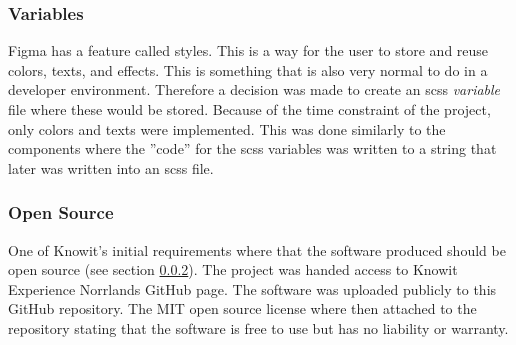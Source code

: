 



\subsubsection{Variables}%
\label{ssub:Variables}
Figma has a feature called styles. This is a way for the user to store and reuse colors, texts, and effects. This is something that is also very normal to do in a developer environment. Therefore a decision was made to create an \acrshort{scss} \textit{variable} file where these would be stored. Because of the time constraint of the project, only colors and texts were implemented. This was done similarly to the components where the ''code'' for the \acrshort{scss} variables was written to a string that later was written into an \acrshort{scss} file. 


\subsubsection{Open Source}%
\label{ssub:Open Source}
One of Knowit's initial requirements where that the software produced should be open source (see section \ref{ssub:Open Source}). The project was handed access to Knowit Experience Norrlands GitHub page. The software was uploaded publicly to this GitHub repository\cite{KnowitExperienceNorrlandFigmaConverter2021}. The MIT\cite{MITLicenseOpen} open source license where then attached to the repository stating that the software is free to use but has no liability or warranty.
 

